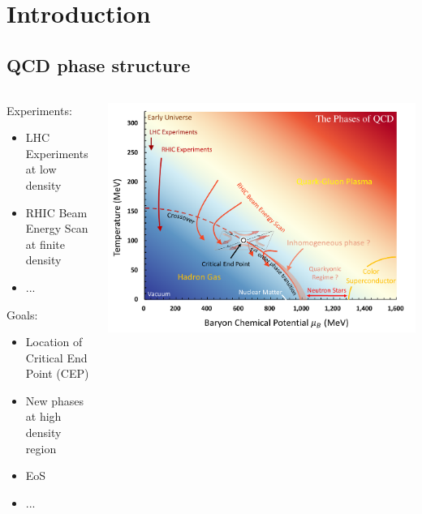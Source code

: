 \section{Introduction}

\subsection{QCD phase structure}
\begin{frame}[fragile] %
    \begin{columns}
        \begin{column}{0.45\textwidth}
        Experiments:
            \begin{itemize}
            \item LHC Experiments at low density\\
            \item RHIC Beam Energy Scan at finite density\\
            \item ...
            \end{itemize}
        Goals:
            \begin{itemize}
            \item Location of Critical End Point (CEP)\\
            \item New phases at high density region \\
            \item EoS \\
            \item ...
            \end{itemize}
        \end{column}
        \begin{column}{0.5\textwidth}
            \includegraphics[width=1.15\linewidth]{Images/Figures/chap1_phase20240311.pdf}

\end{column}
\end{columns}
\end{frame}
